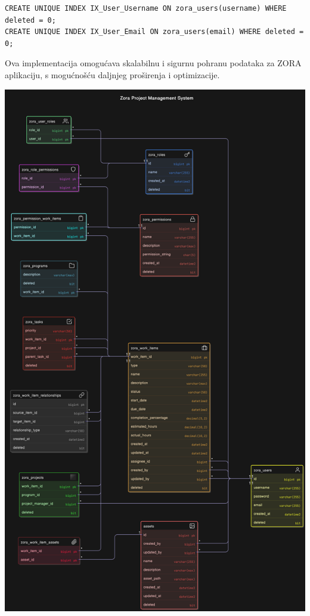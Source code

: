 \documentclass[a4paper,12pt]{article}
\begin{document}
\begin{lstlisting}[style=sqlstyle]
CREATE UNIQUE INDEX IX_User_Username ON zora_users(username) WHERE deleted = 0;
CREATE UNIQUE INDEX IX_User_Email ON zora_users(email) WHERE deleted = 0;
\end{lstlisting}

Ova implementacija omogućava skalabilnu i sigurnu pohranu podataka za ZORA aplikaciju, s mogućnošću daljnjeg proširenja i optimizacije.

\begin{center}
    \includegraphics[width=\textwidth]{../zora_diagram.png}
\end{center}
\end{document}
